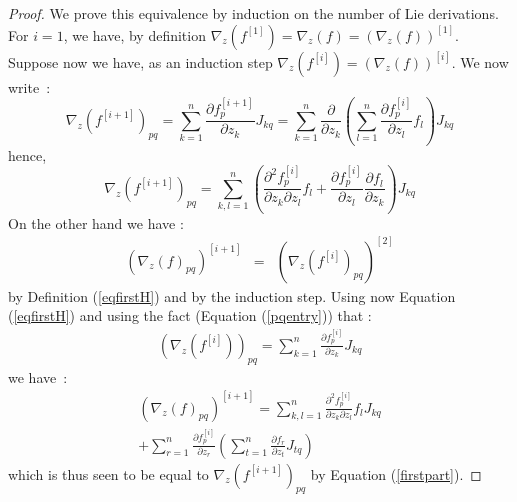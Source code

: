 \documentclass{sig-alternate-05-2015} %
\begin{document}
\begin{proof}
We prove this equivalence by induction on the number of Lie derivations. 
For $i=1$, we have, by definition $\nabla_z(f^{[1]})
=\nabla_z(f)=(\nabla_z(f))^{[1]}$. Suppose now we have, as an induction
step $\nabla_z(f^{[i]})=(\nabla_z(f))^{[i]}$. We now write~:
$$
\nabla_z(f^{[i+1]})_{pq} 
= 
\sum\limits_{k=1}^n \frac{\partial f^{[i+1]}_p}{\partial z_k} J_{kq} 
= 
\sum\limits_{k=1}^n \frac{\partial}{\partial z_k} \left(
\sum\limits_{l=1}^n \frac{\partial{f^{[i]}_p}}{\partial z_l} f_l
\right)J_{kq}
$$
\noindent hence, 
\begin{equation}
\nabla_z(f^{[i+1]})_{pq} =  \sum\limits_{k,l=1}^n \left(\frac{\partial^2 f_p^{[i]}}{\partial z_k \partial z_l} f_l
+\frac{\partial f_p^{[i]}}{\partial z_l}\frac{\partial f_l}{\partial z_k}\right)
J_{kq}
\label{firstpart}
\end{equation}
On the other hand we have : 
$$\begin{array}{rcl}
(\nabla_z(f)_{pq})^{[i+1]} & = &
(\nabla_z(f^{[i]})_{pq})^{[2]}
\end{array}$$
\noindent by Definition (\ref{eqfirstH}) and by the induction step. 
Using now Equation (\ref{eqfirstH}) and using the fact (Equation (\ref{pqentry})) that :
$$\begin{array}{rcl}
(\nabla_z(f^{[i]}))_{pq} = \sum\limits_{k=1}^n \frac{\partial f^{[i]}_p}{\partial z_k} J_{kq}
\end{array}$$
\noindent we have~:  
\begin{multline}
(\nabla_z(f)_{pq})^{[i+1]}  = 
\sum\limits_{k,l=1}^n \frac{\partial^2 f_p^{[i]}}{\partial z_k \partial z_l} f_l J_{kq} \\
+ \sum\limits_{r=1}^n \frac{\partial f_p^{[i]}}{\partial z_r}\left(\sum\limits_{t=1}^n
\frac{\partial f_r}{\partial z_t} J_{tq} \right)
\end{multline}
\noindent which is thus seen to be equal to $\nabla_z(f^{[i+1]})_{pq}$ by
Equation (\ref{firstpart}). 
\end{proof}
\end{document}
